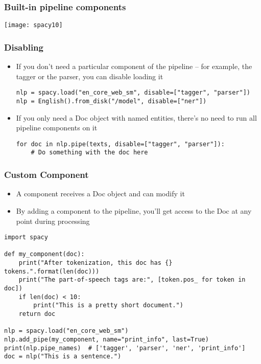\begin{frame}[fragile]\frametitle{Built-in pipeline components}
\begin{center}
\texttt{[image: spacy10]}
\end{center}

\end{frame}

\begin{frame}[fragile]\frametitle{Disabling}
  \begin{itemize}
    \item If you don't need a particular component of the pipeline – for example, the tagger or the parser, you can disable loading it
		\begin{lstlisting}
nlp = spacy.load("en_core_web_sm", disable=["tagger", "parser"])
nlp = English().from_disk("/model", disable=["ner"])
\end{lstlisting}

\item If you only need a Doc object with named entities, there's no need to run all pipeline components on it
		\begin{lstlisting}
for doc in nlp.pipe(texts, disable=["tagger", "parser"]):
    # Do something with the doc here
\end{lstlisting}
  \end{itemize}
	
	
\end{frame}

\begin{frame}[fragile]\frametitle{Custom Component}
  \begin{itemize}
    \item A component receives a Doc object and can modify it


\item  By adding a component to the pipeline, you'll get access to the Doc at any point during processing
  \end{itemize}
	
		\begin{lstlisting}
import spacy

def my_component(doc):
    print("After tokenization, this doc has {} tokens.".format(len(doc)))
    print("The part-of-speech tags are:", [token.pos_ for token in doc])
    if len(doc) < 10:
        print("This is a pretty short document.")
    return doc

nlp = spacy.load("en_core_web_sm")
nlp.add_pipe(my_component, name="print_info", last=True)
print(nlp.pipe_names)  # ['tagger', 'parser', 'ner', 'print_info']
doc = nlp("This is a sentence.")
\end{lstlisting}	
	
\end{frame}

